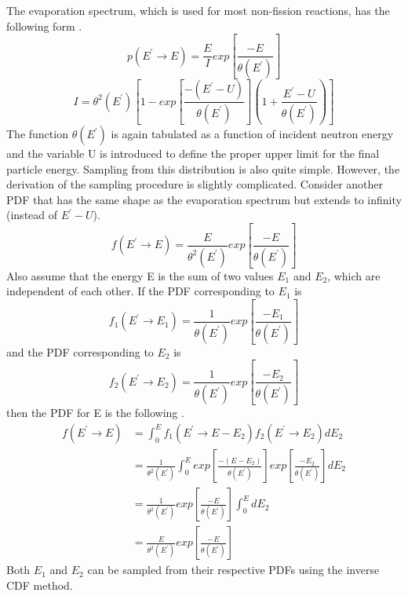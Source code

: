 The evaporation spectrum, which is used for most non-fission reactions, has the following form \citep{chadwick_endf/b-vii.1_2011}.
\begin{equation}
  p(E^{'} \to E) = \frac{E}{I}exp\left[\frac{-E}{\theta(E^{'})}\right]
\end{equation}
\begin{equation}
  I = \theta^2(E^{'})\left[1 - exp\left[\frac{-(E^{'}-U)}{\theta(E^{'})}\right]
    \left(1+\frac{E^{'}-U}{\theta(E^{'})}\right)\right]
\end{equation}
The function $\theta(E^{'})$ is again tabulated as a function of incident
neutron energy and the variable U is introduced to define the proper upper 
limit for the final particle energy. Sampling from this distribution is also
quite simple. However, the derivation of the sampling procedure is slightly
complicated. Consider another PDF that has the same shape as the 
evaporation spectrum but extends to infinity (instead of $E^{'}-U$). 
\begin{equation}
  f(E^{'} \to E) = \frac{E}{\theta^2(E^{'})}exp\left[\frac{-E}{\theta(E^{'})}
    \right]
\end{equation}
Also assume that the energy E is the sum of two values $E_1$ and $E_2$, which
are independent of each other. If the PDF corresponding to $E_1$ is
\begin{equation}
  f_1(E^{'} \to E_1) = \frac{1}{\theta(E^{'})}exp\left[\frac{-E_1}{\theta(E^{'})}
    \right]
\end{equation}
and the PDF corresponding to $E_2$ is 
\begin{equation}
  f_2(E^{'} \to E_2) = \frac{1}{\theta(E^{'})}exp\left[\frac{-E_2}{\theta(E^{'})}
    \right]
\end{equation}
then the PDF for E is the following \citep{kahn_applications_1956}.
\begin{align}
  f(E^{'} \to E) & = \int_0^{E}f_1(E^{'} \to E-E_2)f_2(E^{'} \to E_2) dE_2 \\
  & = \frac{1}{\theta^2(E^{'})}\int_0^{E} exp\left[\frac{-(E-E_2)}{\theta(E^{'})}
    \right] exp\left[\frac{-E_2}{\theta(E^{'})}\right] dE_2 \nonumber \\
  & = \frac{1}{\theta^2(E^{'})} exp\left[\frac{-E}{\theta(E^{'})}\right]
  \int_0^{E} dE_2 \nonumber \\
  & = \frac{E}{\theta^2(E^{'})}exp\left[\frac{-E}{\theta(E^{'})}\right] \nonumber
\end{align}
Both $E_1$ and $E_2$ can be sampled from their respective PDFs using the
inverse CDF method. 
